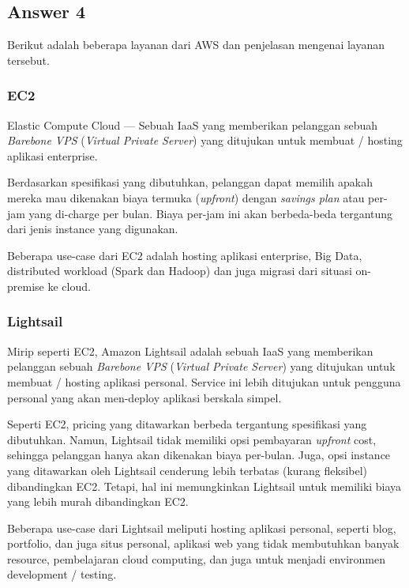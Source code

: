 \documentclass[
	11pt, %
	indonesian
]{assignment}
\begin{document}
\subsection*{Answer 4}

Berikut adalah beberapa layanan dari AWS dan penjelasan mengenai layanan tersebut.

\subsubsection*{EC2}

Elastic Compute Cloud --- Sebuah IaaS yang memberikan pelanggan sebuah \textit{Barebone VPS} (\textit{Virtual Private Server}) yang ditujukan untuk membuat / hosting aplikasi enterprise.

Berdasarkan spesifikasi yang dibutuhkan, pelanggan dapat memilih apakah mereka mau dikenakan biaya termuka (\textit{upfront}) dengan \textit{savings plan} atau per-jam yang di-charge per bulan. Biaya per-jam ini akan berbeda-beda tergantung dari jenis instance yang digunakan.

Beberapa use-case dari EC2 adalah hosting aplikasi enterprise, Big Data, distributed workload (Spark dan Hadoop) dan juga migrasi dari situasi on-premise ke cloud.

\subsubsection*{Lightsail}

Mirip seperti EC2, Amazon Lightsail adalah sebuah IaaS yang memberikan pelanggan sebuah \textit{Barebone VPS} (\textit{Virtual Private Server}) yang ditujukan untuk membuat / hosting aplikasi personal. Service ini lebih ditujukan untuk pengguna personal yang akan men-deploy aplikasi berskala simpel.

Seperti EC2, pricing yang ditawarkan berbeda tergantung spesifikasi yang dibutuhkan. Namun, Lightsail tidak memiliki opsi pembayaran \textit{upfront} cost, sehingga pelanggan hanya akan dikenakan biaya per-bulan. Juga, opsi instance yang ditawarkan oleh Lightsail cenderung lebih terbatas (kurang fleksibel) dibandingkan EC2. Tetapi, hal ini memungkinkan Lightsail untuk memiliki biaya yang lebih murah dibandingkan EC2.

Beberapa use-case dari Lightsail meliputi hosting aplikasi personal, seperti blog, portfolio, dan juga situs personal, aplikasi web yang tidak membutuhkan banyak resource, pembelajaran cloud computing, dan juga untuk menjadi environmen development / testing.
\end{document}
